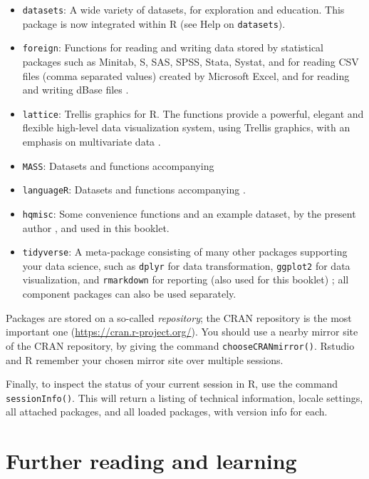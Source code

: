 \documentclass[]{book}
\begin{document}
\begin{itemize}
\item
  \texttt{datasets}: A wide
  variety of datasets, for exploration and education. This
  package is now integrated within R (see Help on \texttt{datasets}).
\item
  \texttt{foreign}: Functions for reading and writing data stored by statistical
  packages such as Minitab, S, SAS, SPSS, Stata, Systat, and for
  reading CSV files (comma separated values) created by Microsoft
  Excel, and for reading and writing dBase files \citep{R-foreign}.
\item
  \texttt{lattice}: Trellis graphics for R. The functions provide a
  powerful, elegant and flexible high-level data visualization system,
  using Trellis graphics, with an emphasis on multivariate data \citep{R-lattice}.
\item
  \texttt{MASS}: Datasets and functions accompanying \citep{VR02, R-MASS}
\item
  \texttt{languageR}: Datasets and functions accompanying \citep{baay08, R-languageR}.
\item
  \texttt{hqmisc}: Some convenience functions and an example dataset, by the present author \citep{R-hqmisc}, and used in this booklet.
\item
  \texttt{tidyverse}: A meta-package consisting of many other packages supporting your data science, such as \texttt{dplyr} for data transformation, \texttt{ggplot2} for data visualization, and \texttt{rmarkdown} for reporting (also used for this booklet) \citep{tidy19}; all component packages can also be used separately.
\end{itemize}

Packages are stored on a so-called \emph{repository}; the CRAN repository is
the most important one (\url{https://cran.r-project.org/}).
You should use a nearby mirror site of the CRAN
repository, by giving the command \texttt{chooseCRANmirror()}.
Rstudio and R remember your chosen mirror site over multiple sessions.

Finally, to inspect the status of your current session in R, use the command \texttt{sessionInfo()}. This will return a listing of technical information, locale settings, all attached packages, and all loaded packages, with version info for each.

\hypertarget{sec:furtherreading}{%
\chapter{Further reading and learning}\label{sec:furtherreading}}
\end{document}
